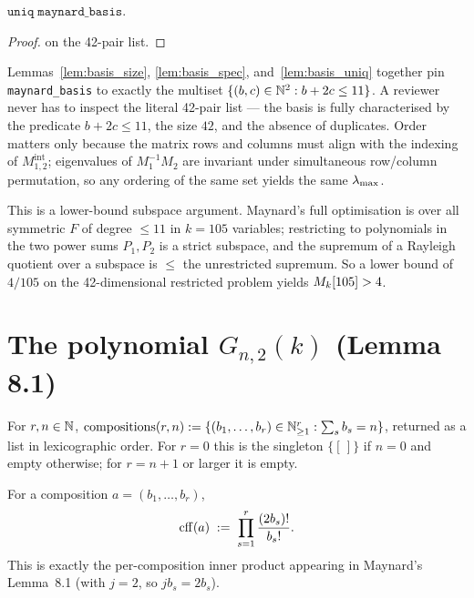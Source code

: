 \begin{lemma}\label{lem:basis_uniq}
\rocqok
{}
$\texttt{uniq}\;\texttt{maynard\_basis}$.
\end{lemma}
\begin{proof}\rocqok
\vmcompute{} on the 42-pair list.
\end{proof}

\begin{remark}
Lemmas~\ref{lem:basis_size}, \ref{lem:basis_spec},
and~\ref{lem:basis_uniq} together pin \texttt{maynard\_basis} to
exactly the multiset $\{(b, c) \in \mathbb{N}^2 : b + 2c \le 11\}$. A reviewer
never has to inspect the literal 42-pair list — the basis is fully
characterised by the predicate $b + 2c \le 11$, the size $42$, and the
absence of duplicates. Order matters only because the matrix rows and
columns must align with the indexing of $M_{1,2}^{\mathrm{int}}$;
eigenvalues of $M_1^{-1} M_2$ are invariant under simultaneous
row/column permutation, so any ordering of the same set yields the
same $\lambda_{\max}$.
\end{remark}

\begin{remark}
This is a lower-bound subspace argument. Maynard's full optimisation is
over all symmetric $F$ of degree $\le 11$ in $k = 105$ variables;
restricting to polynomials in the two power sums $P_1, P_2$ is a
strict subspace, and the supremum of a Rayleigh quotient over a
subspace is $\le$ the unrestricted supremum. So a lower bound of
$4/105$ on the 42-dimensional restricted problem yields
$M_k[105] > 4$.
\end{remark}

\section{The polynomial \texorpdfstring{$G_{n,2}(k)$}{G\_n,2(k)} (Lemma 8.1)}

\begin{definition}[Compositions of $n$]\label{def:compositions}
\rocqok
For $r, n \in \mathbb{N}$,
$\mathrm{compositions}(r, n) := \{(b_1, \ldots, b_r) \in \mathbb{N}_{\ge 1}^r : \sum_s b_s = n\}$,
returned as a list in lexicographic order.  For $r = 0$ this is the
singleton $\{[\,]\}$ if $n = 0$ and empty otherwise; for $r = n + 1$
or larger it is empty.
\end{definition}

\begin{definition}\label{def:cff}
\rocqok
{}
For a composition $a = (b_1, \ldots, b_r)$,
\[
\mathrm{cff}(a) \;:=\; \prod_{s=1}^{r} \frac{(2 b_s)!}{b_s!}.
\]
This is exactly the per-composition inner product appearing in
Maynard's Lemma~8.1 (with $j = 2$, so $j b_s = 2 b_s$).
\end{definition}

